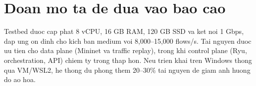 \documentclass[12pt,a4paper]{article}
\begin{document}
\section{Doan mo ta de dua vao bao cao}

\noindent
Testbed duoc cap phat 8 vCPU, 16 GB RAM, 120 GB SSD va ket noi 1 Gbps, dap ung on dinh cho kich ban medium voi 8,000--15,000 flows/s. Tai nguyen duoc uu tien cho data plane (Mininet va traffic replay), trong khi control plane (Ryu, orchestration, API) chiem ty trong thap hon. Neu trien khai tren Windows thong qua VM/WSL2, he thong du phong them 20--30\% tai nguyen de giam anh huong do ao hoa.
\end{document}
